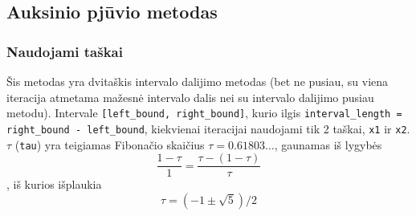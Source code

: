 \documentclass[lithuanian,a4paper,12pt]{article}
\newcommand{\mil}{\texttt}
\begin{document}
\pagebreak
\subsection{Auksinio pjūvio metodas}
\subsubsection*{Naudojami taškai}
Šis metodas yra dvitaškis intervalo dalijimo metodas (bet ne pusiau, su viena iteracija atmetama mažesnė intervalo dalis nei su intervalo dalijimo pusiau metodu). Intervale \mil{[left_bound, right_bound]}, kurio ilgis \mil{interval_length = right_bound - left_bound}, kiekvienai iteracijai naudojami tik 2 taškai, \mil{x1} ir \mil{x2}. $\tau$ (\mil{tau}) yra teigiamas Fibonačio skaičius $\tau = 0.61803\ldots$, gaunamas iš lygybės
\begin{equation*}
    \frac{1 - \tau}{1} = \frac{\tau - (1 - \tau)}{\tau}
\end{equation*}
, iš kurios išplaukia
\begin{equation*}
    \tau = (-1 \pm \sqrt{5}) / 2
\end{equation*}

\pagebreak
\end{document}
